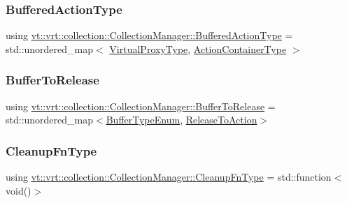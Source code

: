 \subsubsection{\texorpdfstring{Buffered\+Action\+Type}{BufferedActionType}}
{\footnotesize\ttfamily using \hyperlink{structvt_1_1vrt_1_1collection_1_1_collection_manager_a7b32db0e6ccafa771ddd72f534a1cf8c}{vt\+::vrt\+::collection\+::\+Collection\+Manager\+::\+Buffered\+Action\+Type} =  std\+::unordered\+\_\+map$<$ \hyperlink{namespacevt_a1b417dd5d684f045bb58a0ede70045ac}{Virtual\+Proxy\+Type}, \hyperlink{structvt_1_1vrt_1_1collection_1_1_collection_manager_a536805fb5c58b557b66e7d7febe87567}{Action\+Container\+Type} $>$}

\mbox{\label{structvt_1_1vrt_1_1collection_1_1_collection_manager_a47d2def9bdf4fb84026c615602779053}} 
\subsubsection{\texorpdfstring{Buffer\+To\+Release}{BufferToRelease}}
{\footnotesize\ttfamily using \hyperlink{structvt_1_1vrt_1_1collection_1_1_collection_manager_a47d2def9bdf4fb84026c615602779053}{vt\+::vrt\+::collection\+::\+Collection\+Manager\+::\+Buffer\+To\+Release} =  std\+::unordered\+\_\+map$<$\hyperlink{namespacevt_1_1vrt_1_1collection_a1b1b082e2ff4e9e5d1b7227acd78db3f}{Buffer\+Type\+Enum}, \hyperlink{structvt_1_1vrt_1_1collection_1_1_collection_manager_abf98645da5d52c568fae8ed6f11ab82f}{Release\+To\+Action}$>$\hspace{0.3cm}{\ttfamily [private]}}

\mbox{\label{structvt_1_1vrt_1_1collection_1_1_collection_manager_a95c122e5b83bc51c306c9367b8e62c07}} 
\subsubsection{\texorpdfstring{Cleanup\+Fn\+Type}{CleanupFnType}}
{\footnotesize\ttfamily using \hyperlink{structvt_1_1vrt_1_1collection_1_1_collection_manager_a95c122e5b83bc51c306c9367b8e62c07}{vt\+::vrt\+::collection\+::\+Collection\+Manager\+::\+Cleanup\+Fn\+Type} =  std\+::function$<$void()$>$}

